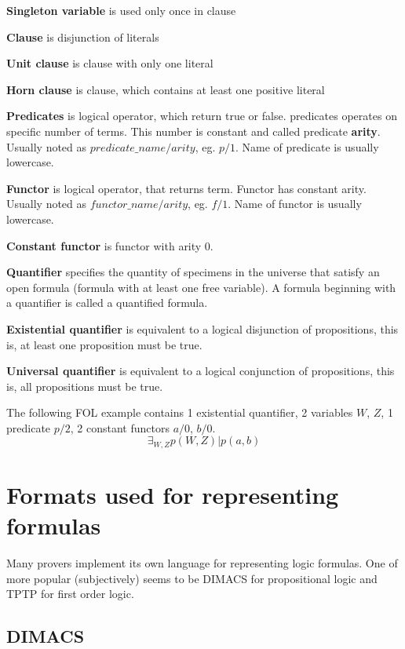 \textbf{Singleton variable}
is used only once in clause

\textbf{Clause}
is disjunction of literals

\textbf{Unit clause}
is clause with only one literal

\textbf{Horn clause}
is clause, which contains at least one positive literal

\textbf{Predicates}
is logical operator, which return true or false. predicates operates on specific number of terms. This number is constant and called predicate \textbf{arity}. Usually noted as $predicate\_name/arity$, eg. $p/1$. Name of predicate is usually lowercase.

\textbf{Functor}
is logical operator, that returns term. Functor has constant arity. Usually noted as $functor\_name/arity$, eg. $f/1$. Name of functor  is usually lowercase.

\textbf{Constant functor}
is functor with arity 0.

\textbf{Quantifier}
specifies the quantity of specimens in the universe that satisfy an open formula (formula with at least one free variable). A formula beginning with a quantifier is called a quantified formula.

\textbf{Existential quantifier}
is equivalent to a logical disjunction of propositions, this is, at least one proposition must be true.

\textbf{Universal quantifier}
is equivalent to a logical conjunction of propositions, this is, all propositions must be true.

The following \gls{FOL} example contains 1 existential quantifier, 2 variables $W$, $Z$, 1 predicate $p/2$, 2 constant functors $a/0$, $b/0$.
\begin{equation} \label{eg:FOL_1}
  \exists_{W,Z} p(W,Z) | p(a, b)
\end{equation}

\section{Formats used for representing formulas}

Many provers implement its own language for representing logic formulas. One of more popular (subjectively)  seems to be DIMACS for propositional logic and TPTP for first order logic.

\subsection{DIMACS}

